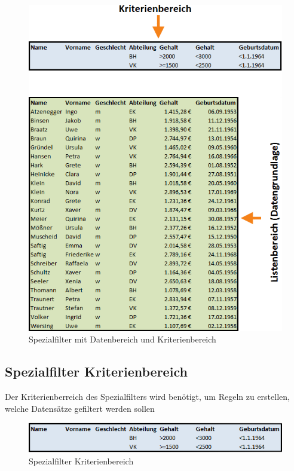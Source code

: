 	\begin{figure}[H]
		\centering
			\includegraphics[scale=0.7]{images/spezialfilter}
		\caption{Spezialfilter mit Datenbereich und Kriterienbereich }
		\label{fig:spezialfilter}
	\end{figure}
	
	
\subsection{Spezialfilter Kriterienbereich}

Der Kriterienberreich des Spezialfilters wird benötigt, um Regeln zu erstellen, welche Datensätze gefiltert werden sollen

	\begin{figure}[H]
		\centering
			\includegraphics[scale=0.7]{images/spezialfilter-kriterienbereich}
		\caption{Spezialfilter Kriterienbereich }
		\label{fig:spezialfilterKriterienbereich}
	\end{figure}
	

